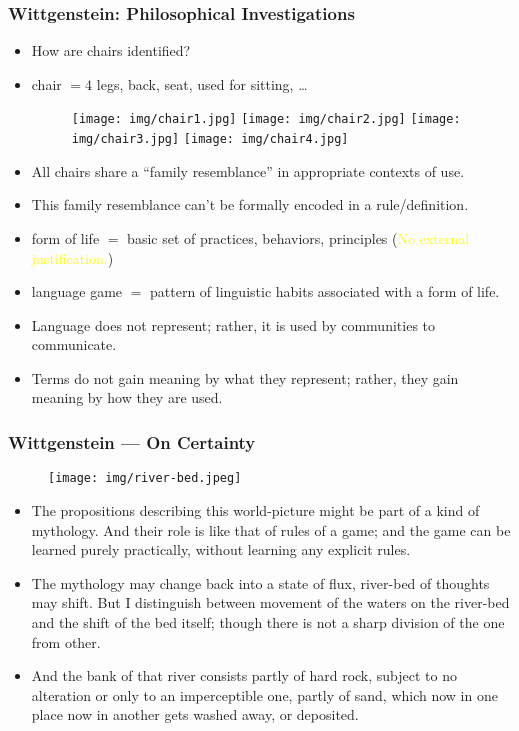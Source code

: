 \documentclass[UTF8,11pt,colorlinks,compress,openany]{beamer}%
\begin{document}
\begin{frame}\frametitle{Wittgenstein: Philosophical Investigations}
\begin{itemize}
	\item How are chairs identified?
	\item chair $= 4$ legs, back, seat, used for sitting, \dots
	\begin{figure}
	\texttt{[image: img/chair1.jpg]}
	\texttt{[image: img/chair2.jpg]}
	\texttt{[image: img/chair3.jpg]}
	\texttt{[image: img/chair4.jpg]}
	\end{figure}
	\item All chairs share a ``family resemblance'' in appropriate contexts of use.
	\item This family resemblance can't be formally encoded in a rule/definition.
	\item form of life $=$ basic set of practices, behaviors, principles (\textcolor{yellow}{No external justification.})
	\item language game $=$ pattern of linguistic habits associated with a form of life.
	\item Language does not represent; rather, it is used by communities to communicate.
	\item Terms do not gain meaning by what they represent; rather, they gain meaning by how they are used.
\end{itemize}
\end{frame}

\begin{frame}\frametitle{Wittgenstein --- On Certainty}
\begin{figure}[H]
\texttt{[image: img/river-bed.jpeg]}
\end{figure}
\begin{itemize}
	\item The propositions describing this world-picture might be part of a kind of mythology. And their role is like that of rules of a game; and the game can be learned purely practically, without learning any explicit rules.
	\item The mythology may change back into a state of flux, river-bed of thoughts may shift. But I distinguish between movement of the waters on the river-bed and the shift of the bed itself; though there is not a sharp division of the one from other.
	\item And the bank of that river consists partly of hard rock, subject to no alteration or only to an imperceptible one, partly of sand, which now in one place now in another gets washed away, or deposited.
\end{itemize}
\end{frame}
\end{document}
